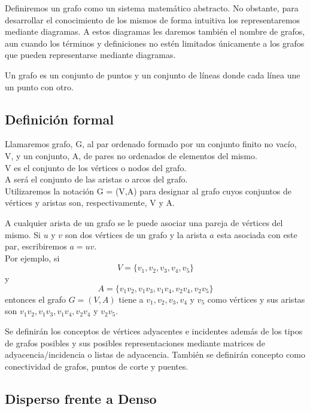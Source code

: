 \documentclass[a4paper,12pt]{article}
\begin{document}
Definiremos un grafo como un sistema matemático abstracto. No obstante, para desarrollar el conocimiento de los mismos de forma intuitiva los representaremos mediante diagramas. A estos diagramas les daremos también el nombre de grafos, aun cuando los términos y definiciones no estén limitados únicamente a los grafos que pueden representarse mediante diagramas.

Un grafo es un conjunto de puntos y un conjunto de líneas donde cada línea une un punto con otro. 

\subsection{Definición formal}

\begin{fondo}
Llamaremos grafo, G, al par ordenado formado por un conjunto finito no vacío, V, y un conjunto, A, de pares no ordenados de elementos del mismo.\\
\smallskip
\quad V es el conjunto de los vértices o nodos del grafo.\\
\smallskip
\quad A será el conjunto de las aristas o arcos del grafo.\\
\smallskip
Utilizaremos la notación G = (V,A) para designar al grafo cuyos conjuntos de vértices y aristas son, respectivamente, V y A.
\end{fondo}

A cualquier arista de un grafo se le puede asociar una pareja de vértices del mismo. Si $u$ y $v$ son dos vértices de un grafo y la arista $a$ esta asociada con este par, escribiremos $a = uv$.\\

Por ejemplo, si\\
\[ V = \{v_1, v_2, v_3, v_4, v_5\} \]
y\\
\[ A = \{v_1v_2, v_1v_3, v_1v_4, v_2v_4, v_2v_5\} \]
entonces el grafo $G = (V,A)$ tiene a $v_1, v_2, v_3, v_4$ y $v_5$ como vértices y sus aristas son $v_1v_2, v_1v_3, v_1v_4, v_2v_4$ y $v_2v_5$.

Se definirán los conceptos de vértices adyacentes e incidentes además de los tipos de grafos posibles y sus posibles representaciones mediante matrices de adyacencia/incidencia o listas de adyacencia. También se definirán concepto como conectividad de grafos, puntos de corte y puentes.

\subsection{Disperso frente a Denso}
\end{document}
